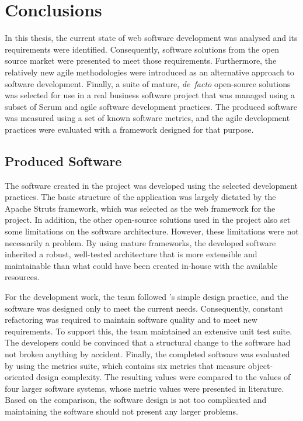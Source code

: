 \chapter{Conclusions}
\label{toc:conclusions}

In this thesis, the current state of web software development was 
analysed and its requirements were identified. Consequently, software 
solutions from the open source market were presented to meet those 
requirements. Furthermore, the relatively new agile methodologies were 
introduced as an alternative approach to software development. 
Finally, a suite of mature, \textsl{de~facto} open-source solutions 
was selected for use in a real business software project that was 
managed using a subset of Scrum and  agile software 
development practices. The produced software was measured using a set 
of known software metrics, and the agile development practices were 
evaluated with a framework designed for that purpose. 


\section{Produced Software}

The software created in the project was developed using the selected 
 development practices. The basic structure of the 
application was largely dictated by the Apache Struts framework, which 
was selected as the web framework for the project. In addition, the 
other open-source solutions used in the project also set some 
limitations on the software architecture. However, these limitations 
were not necessarily a problem. By using mature frameworks, the 
developed software inherited a robust, well-tested architecture that 
is more extensible and maintainable than what could have been created 
in-house with the available resources.

For the development work, the team followed 's simple 
design practice, and the software was designed only to meet the 
current needs. Consequently, constant refactoring was required to 
maintain software quality and to meet new requirements. To support 
this, the team maintained an extensive unit test suite. The developers 
could be convinced that a structural change to the software had not 
broken anything by accident. Finally, the completed software was 
evaluated by using the  metrics suite, which contains six 
metrics that measure object-oriented design complexity. The resulting 
values were compared to the values of four larger software systems, 
whose metric values were presented in literature. Based on the 
comparison, the software design is not too complicated and maintaining 
the software should not present any larger problems.


